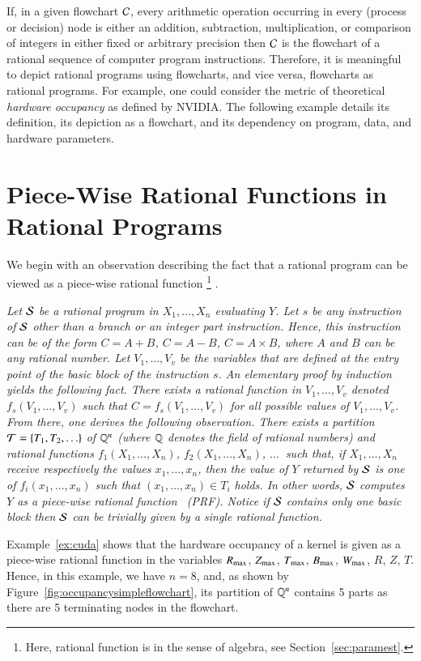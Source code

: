 If, in a given flowchart ${\cal C}$, every arithmetic
operation occurring in every (process or decision) node is
either an addition, subtraction, multiplication, or comparison of integers
in either fixed or arbitrary precision
then ${\cal C}$ is the flowchart of a rational sequence of computer
program instructions.
Therefore, it is meaningful to depict rational programs
using flowcharts, and vice versa, 
flowcharts as rational programs.
For example, one could consider the metric 
of theoretical {\em hardware occupancy} as defined by 
NVIDIA. 
The following example details its definition, 
its depiction as a flowchart, and its dependency on
program, data, and hardware parameters.





\section{Piece-Wise Rational Functions in Rational Programs}
\label{sec:prf_rp}

We begin with an observation describing the fact that a rational program
can be viewed as a piece-wise rational function \footnote{Here, rational function is in the
	sense of algebra, see Section~\ref{sec:paramest}.} .
\begin{observation}
\label{obs:rationality}
{\em
Let ${\cal S}$ be a rational program in $X_1, \ldots, X_n$ evaluating $Y$.
Let $s$ be any instruction of ${\cal S}$ other than a branch or an
integer part instruction.  
Hence, this instruction can be of the form
$C = A + B$, $C = A - B$, $C = A \times B$, where $A$ and
$B$ can be any rational number.
%
Let $V_1, \ldots, V_v$ be the variables that are defined
at the entry point of the basic block of the instruction $s$.
An elementary proof by induction yields the following fact.
There exists a rational function in $V_1,
\ldots, V_v$ denoted $f_s(V_1, \ldots, V_v)$
such that $C = f_s(V_1, \ldots, V_v)$ for all possible values of
$V_1, \ldots, V_v$.
%
From there, one derives the following observation.
There exists a partition ${\cal T} = \{ T_1, T_2, \ldots    \}$ 
of ${\mathbb{Q}}^n$ (where ${\mathbb{Q}}$ denotes the field of rational numbers)
and rational functions $f_1(X_1, \ldots, X_n)$, 
$f_2(X_1, \ldots, X_n)$, $\ldots\ $
such that, if $X_1, \ldots, X_n$ receive respectively 
the values $x_1, \ldots, x_n$, then
the value of $Y$ returned by ${\cal S}$ is one of
$f_i(x_1, \ldots, x_n)$ such that
$(x_1, \ldots, x_n) \in T_i$ holds.
In other words, ${\cal S}$ computes $Y$ as a
{\em piece-wise rational function} \, (PRF).
Notice if ${\cal S}$ contains
only one basic block then ${\cal S}$ 
can be trivially given by a single rational function.

Example~\ref{ex:cuda} 
shows that the hardware occupancy of a {\cuda}
kernel is given as a piece-wise rational function
in the variables $R_{\rm max}$, $Z_{\rm max}$,
$T_{\rm max}$, $B_{\rm max}$, $W_{\rm max}$, $R$, $Z$, $T$.
Hence, in this example, we have $n = 8$, 
and, as shown by Figure~\ref{fig:occupancysimpleflowchart}, 
its partition of ${\mathbb{Q}}^n$ contains 5 parts
as there are 5 terminating nodes in the flowchart.

}
\end{observation}

